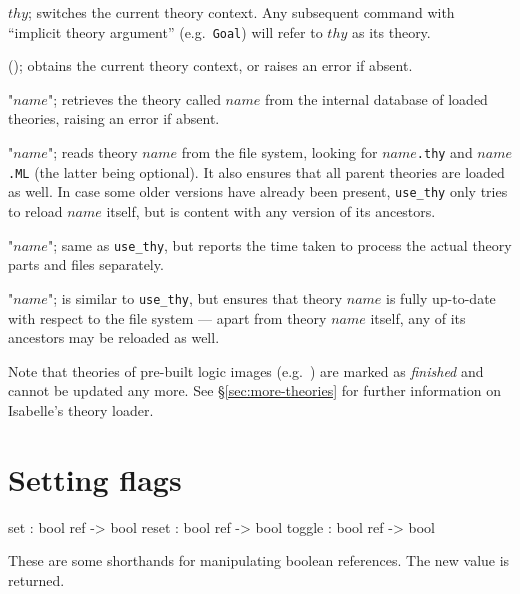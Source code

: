 \begin{ttdescription}
  
\item[\ttindexbold{context} $thy$;] switches the current theory context.  Any
  subsequent command with ``implicit theory argument'' (e.g.\ \texttt{Goal})
  will refer to $thy$ as its theory.
  
\item[\ttindexbold{the_context}();] obtains the current theory context, or
  raises an error if absent.
  
\item[\ttindexbold{theory} "$name$";] retrieves the theory called $name$ from
  the internal data\-base of loaded theories, raising an error if absent.
  
\item[\ttindexbold{use_thy} "$name$";] reads theory $name$ from the file
  system, looking for $name$\texttt{.thy} and $name$\texttt{.ML} (the latter
  being optional).  It also ensures that all parent theories are loaded as
  well.  In case some older versions have already been present,
  \texttt{use_thy} only tries to reload $name$ itself, but is content with any
  version of its ancestors.
  
\item[\ttindexbold{time_use_thy} "$name$";] same as \texttt{use_thy}, but
  reports the time taken to process the actual theory parts and {\ML} files
  separately.
  
\item[\ttindexbold{update_thy} "$name$";] is similar to \texttt{use_thy}, but
  ensures that theory $name$ is fully up-to-date with respect to the file
  system --- apart from theory $name$ itself, any of its ancestors may be
  reloaded as well.
  
\end{ttdescription}

Note that theories of pre-built logic images (e.g.\ {\HOL}) are marked as
\emph{finished} and cannot be updated any more.  See \S\ref{sec:more-theories}
for further information on Isabelle's theory loader.


\section{Setting flags}
\begin{ttbox}
set     : bool ref -> bool
reset   : bool ref -> bool
toggle  : bool ref -> bool
\end{ttbox}
These are some shorthands for manipulating boolean references.  The new
value is returned.


